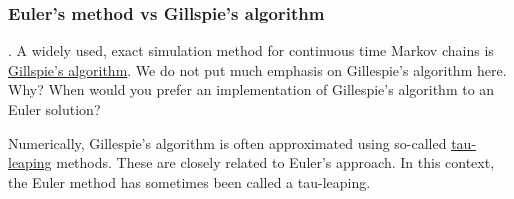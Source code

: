 \documentclass{beamer}\usepackage[]{graphicx}\usepackage[]{color}
\newcommand\answer[2]{#1} %
\begin{document}
%
%
%
%
%
%
%
%
%

\begin{frame}[fragile]

\frametitle{Euler's method vs Gillspie's algorithm}

\myquestion. A widely used, exact simulation method for continuous time Markov chains is  \href{https://en.wikipedia.org/wiki/Gillespie_algorithm}{Gillspie's algorithm}.
We do not put much emphasis on Gillespie's algorithm here. Why? When would you prefer an implementation of Gillespie's algorithm to an Euler solution?

\answer{\vspace{20mm}}{todo}

Numerically, Gillespie's algorithm is often approximated using so-called
\href{https://en.wikipedia.org/wiki/Tau-leaping}{tau-leaping}
methods. These are closely related to Euler's approach. In this context, the Euler method has sometimes been called a tau-leaping.



\end{frame}
\end{document}
